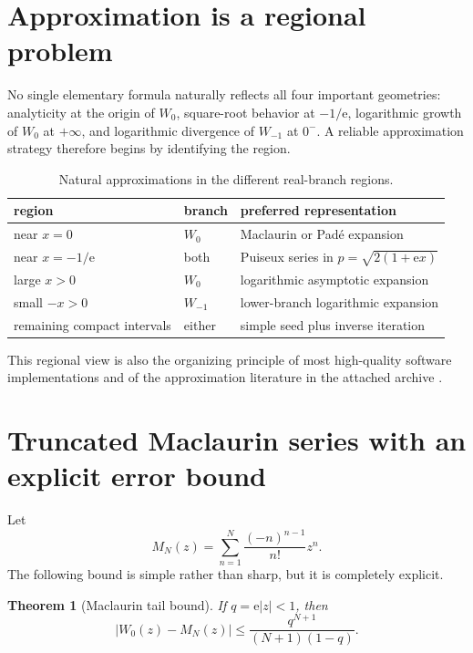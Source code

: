 \documentclass[11pt,openany]{book}
\newcommand{\e}{\mathrm{e}}
\newcommand{\abs}[1]{\left|#1\right|}
\theoremstyle{plain}
\newtheorem{theorem}{Theorem}[chapter]
\theoremstyle{definition}
\theoremstyle{remark}
\begin{document}
\section{Approximation is a regional problem}
No single elementary formula naturally reflects all four important geometries:
analyticity at the origin of \(W_0\), square-root behavior at \(-1/\e\),
logarithmic growth of \(W_0\) at \(+\infty\), and logarithmic divergence of
\(W_{-1}\) at \(0^-\).  A reliable approximation strategy therefore begins by
identifying the region.

\begin{table}[htbp]
\centering
\caption{Natural approximations in the different real-branch regions.}
\label{tab:approxregions}
\begin{tabular}{@{}lll@{}}
\toprule
region & branch & preferred representation \\
\midrule
near \(x=0\) & \(W_0\) & Maclaurin or Pad\'{e} expansion \\
near \(x=-1/\e\) & both & Puiseux series in \(p=\sqrt{2(1+\e x)}\) \\
large \(x>0\) & \(W_0\) & logarithmic asymptotic expansion \\
small \(-x>0\) & \(W_{-1}\) & lower-branch logarithmic expansion \\
remaining compact intervals & either & simple seed plus inverse iteration \\
\bottomrule
\end{tabular}
\end{table}

This regional view is also the organizing principle of most high-quality
software implementations and of the approximation literature in the attached
archive \cite{Barry2000,IaconoBoyd2017,Howard2022,Howard2025,Loczi2022}.

\section{Truncated Maclaurin series with an explicit error bound}
Let
\[
       M_N(z)=\sum_{n=1}^{N}\frac{(-n)^{n-1}}{n!}z^n.
\]
The following bound is simple rather than sharp, but it is completely explicit.

\begin{theorem}[Maclaurin tail bound]\label{thm:maclaurintail}
If \(q=\e\abs z<1\), then
\begin{equation}\label{eq:maclaurintail}
 \abs{W_0(z)-M_N(z)}
 \le\frac{q^{N+1}}{(N+1)(1-q)}.
\end{equation}
\end{theorem}
\end{document}
